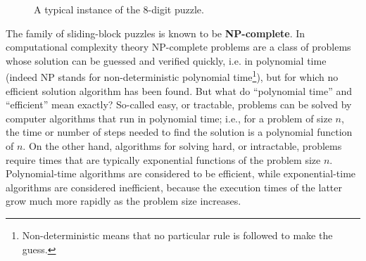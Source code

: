 \begin{figure}[h!t]
\caption{A typical instance of the 8-digit puzzle.}\label{8DigitPuzzle}
\end{figure}

The family of sliding-block puzzles is known to be \textbf{NP-complete}. In computational complexity theory NP-complete problems are a class of problems whose solution can be guessed and verified quickly, i.e. in polynomial time (indeed NP stands for non-deterministic polynomial time\footnote{Non-deterministic means that no particular rule is followed to make the guess.}), but for which no efficient solution algorithm has been found. But what do ``polynomial time'' and ``efficient'' mean exactly? So-called easy, or tractable, problems can be solved by computer algorithms that run in polynomial time; i.e., for a problem of size $n$, the time or number of steps needed to find the solution is a polynomial function of $n$. On the other hand, algorithms for solving hard, or intractable, problems require times that are typically exponential functions of the problem size $n$. Polynomial-time algorithms are considered to be efficient, while exponential-time algorithms are considered inefficient, because the execution times of the latter grow much more rapidly as the problem size increases.

